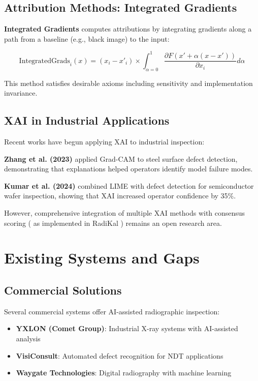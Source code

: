 \documentclass[12pt,a4paper]{report}
\begin{document}
\subsection{Attribution Methods: Integrated Gradients}

\textbf{Integrated Gradients} computes attributions by integrating gradients along a path from a baseline (e.g., black image) to the input:

\begin{equation}
\text{IntegratedGrads}_i(x) = (x_i - x'_i) \times \int_{\alpha=0}^{1} \frac{\partial F(x' + \alpha(x-x'))}{\partial x_i} d\alpha
\end{equation}

This method satisfies desirable axioms including sensitivity and implementation invariance.

\subsection{XAI in Industrial Applications}

Recent works have begun applying XAI to industrial inspection:

\textbf{Zhang et al. (2023)} applied Grad-CAM to steel surface defect detection, demonstrating that explanations helped operators identify model failure modes.

\textbf{Kumar et al. (2024)} combined LIME with defect detection for semiconductor wafer inspection, showing that XAI increased operator confidence by 35\%.

However, comprehensive integration of multiple XAI methods with consensus scoring ( as implemented in RadiKal ) remains an open research area.

\section{Existing Systems and Gaps}

\subsection{Commercial Solutions}

Several commercial systems offer AI-assisted radiographic inspection:

\begin{itemize}
    \item \textbf{YXLON (Comet Group)}: Industrial X-ray systems with AI-assisted analysis
    \item \textbf{VisiConsult}: Automated defect recognition for NDT applications
    \item \textbf{Waygate Technologies}: Digital radiography with machine learning
\end{itemize}
\end{document}
